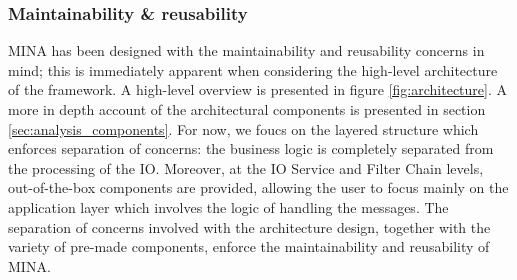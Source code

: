


\subsubsection{Maintainability \& reusability}
MINA has been designed with the maintainability and reusability concerns in mind; this is immediately apparent when considering the high-level architecture of the framework. A high-level overview is presented in figure \ref{fig:architecture}. A more in depth account of the architectural components is presented in section \ref{sec:analysis_components}. For now, we foucs on the layered structure which enforces separation of concerns: the business logic is completely separated from the processing of the IO. Moreover, at the IO Service and Filter Chain levels, out-of-the-box components are provided, allowing the user to focus mainly on the application layer which involves the logic of handling the messages. The separation of concerns involved with the architecture design, together with the variety of pre-made components, enforce the maintainability and reusability of MINA.



